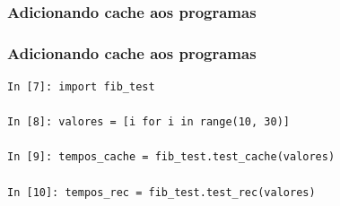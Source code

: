 \documentclass[aspectratio=169]{beamer}
\begin{document}
\begin{frame}[fragile]
	\frametitle{Adicionando cache aos programas}
	
\end{frame}

\begin{frame}[fragile]
	\frametitle{Adicionando cache aos programas}
	\begin{lstlisting}
In [7]: import fib_test

In [8]: valores = [i for i in range(10, 30)]

In [9]: tempos_cache = fib_test.test_cache(valores)

In [10]: tempos_rec = fib_test.test_rec(valores)
	\end{lstlisting}
\end{frame}
\end{document}
